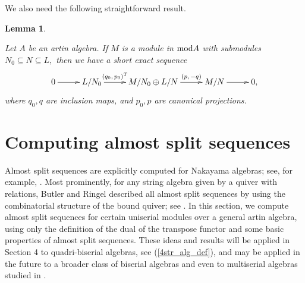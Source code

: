 \documentclass[10pt]{amsart}
\newtheorem{Lemma}[Theo]{Lemma}
\theoremstyle{definition}
\newcommand{\mmod}{{\rm mod}}
\begin{document}

\vspace{1pt}

We also need the following straightforward result.

\vspace{-2pt}

\begin{Lemma} \label{ses_mix}

Let $A$ be an artin algebra. If $M$ is a module in $\mmod A$ with sub\-modules $N_0\subseteq N\subseteq L,$ then we have a short exact sequence \vspace{-6pt}  
$$\xymatrixcolsep{26pt} \xymatrix{0\ar[r]& L/N_0\ar[r]^-{(q_0, \, p_0)^T}  & M/N_0\oplus L/N  \ar[r]^-{(p, \, -q)} & M/N \ar[r] & 0,}\vspace{-5pt} $$  where $q_0, q$ are inclusion maps, and $p_0, p$ are canonical projections.

\end{Lemma}


\section{\sc Computing almost split sequences} 

Almost split sequences are explicitly computed for Nakayama algebras; see, for example, \cite[p.~ 197]{ARS}. Most prominently, for any string algebra given by a quiver with relations, Butler and Ringel described all almost split sequences by using the combinatorial structure of the bound quiver; see \cite{BuR}. In this section, we compute almost split sequences for certain uniserial modules over a general artin algebra, using only the definition of the dual of the transpose functor and some basic properties of almost split sequences. These ideas and results will be applied in Section 4 to quadri-biserial algebras, see (\ref{4str_alg_def}), and may be applied in the future to a broader class of biserial algebras and even to multiserial algebras studied in \cite{VHW}.
\end{document}
